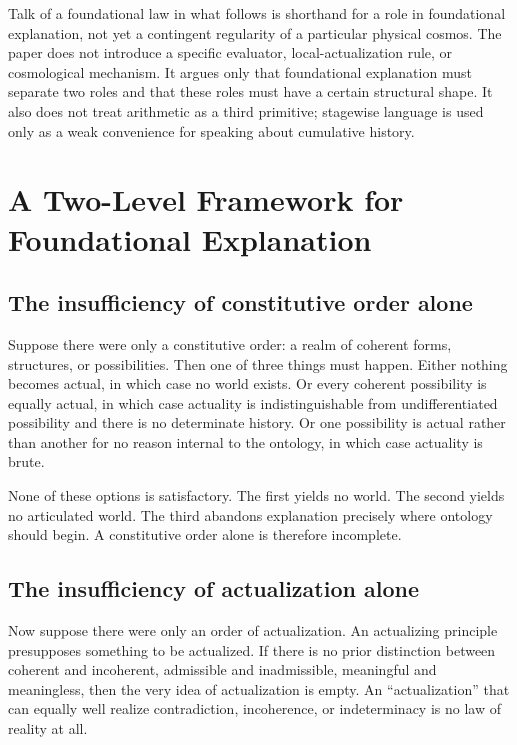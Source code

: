 \documentclass[11pt]{article}
\theoremstyle{foundation}
\begin{document}
Talk of a foundational law in what follows is shorthand for a role in foundational explanation, not yet a contingent regularity of a particular physical cosmos. The paper does not introduce a specific evaluator, local-actualization rule, or cosmological mechanism. It argues only that foundational explanation must separate two roles and that these roles must have a certain structural shape. It also does not treat arithmetic as a third primitive; stagewise language is used only as a weak convenience for speaking about cumulative history.

\section{A Two-Level Framework for Foundational Explanation}

\subsection{The insufficiency of constitutive order alone}

Suppose there were only a constitutive order: a realm of coherent forms, structures, or possibilities. Then one of three things must happen. Either nothing becomes actual, in which case no world exists. Or every coherent possibility is equally actual, in which case actuality is indistinguishable from undifferentiated possibility and there is no determinate history. Or one possibility is actual rather than another for no reason internal to the ontology, in which case actuality is brute.

None of these options is satisfactory. The first yields no world. The second yields no articulated world. The third abandons explanation precisely where ontology should begin. A constitutive order alone is therefore incomplete.

\subsection{The insufficiency of actualization alone}

Now suppose there were only an order of actualization. An actualizing principle presupposes something to be actualized. If there is no prior distinction between coherent and incoherent, admissible and inadmissible, meaningful and meaningless, then the very idea of actualization is empty. An ``actualization'' that can equally well realize contradiction, incoherence, or indeterminacy is no law of reality at all.
\end{document}
